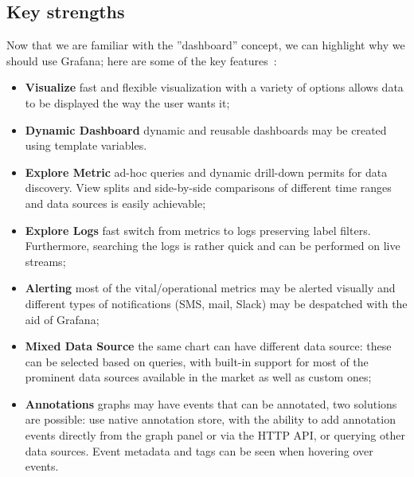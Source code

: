 \subsection{Key strengths}
Now that we are familiar with the ''dashboard'' concept, we can highlight why we should use Grafana; here are some of the key features~\cite{Article:comprehensive_study_grafana}:
\begin{itemize}
    \item \textbf{Visualize} fast and flexible visualization with a variety of options allows data to be displayed the way the user wants it;
    \item \textbf{Dynamic Dashboard} dynamic and reusable dashboards may be created using template variables.
    \item \textbf{Explore Metric} ad-hoc queries and dynamic drill-down permits for data discovery.
          View splits and side-by-side comparisons of different time ranges and data sources is easily achievable;
    \item \textbf{Explore Logs} fast switch from metrics to logs preserving label filters. Furthermore, searching the logs is rather quick and can be performed on live streams;
    \item \textbf{Alerting} most of the vital/operational metrics may be alerted visually and different types of notifications (SMS, mail, Slack) may be despatched with the aid of Grafana;
    \item \textbf{Mixed Data Source} the same chart can have different data source: these can be selected based on queries, with built-in support for most of the prominent data sources available in the market as well as custom ones;
    \item \textbf{Annotations} graphs may have events that can be annotated, two solutions are possible:
          use native annotation store, with the ability to add annotation events directly from the graph panel or via the HTTP API, or querying other data sources.
          Event metadata and tags can be seen when hovering over events.
\end{itemize}

